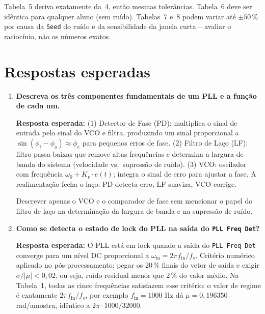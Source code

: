 \documentclass[11pt,a4paper]{article}
\begin{document}
\begin{nota}
Tabela~5 deriva exatamente da~4, então mesmas tolerâncias. Tabela~6
deve ser idêntica para qualquer aluno (sem ruído). Tabelas~7 e~8 podem
variar até $\pm 50\,\%$ por causa da \texttt{Seed} do ruído e da
sensibilidade da janela curta -- avaliar o raciocínio, não os números
exatos.
\end{nota}

\section*{Respostas esperadas}

\begin{enumerate}[label=\textbf{Q\arabic*.}, leftmargin=*, itemsep=1em]

  \item \textbf{Descreva os três componentes fundamentais de um PLL e a função de cada um.}

    \textbf{Resposta esperada:} (1) Detector de Fase (PD): multiplica o sinal de entrada
    pelo sinal do VCO e filtra, produzindo um sinal proporcional a
    $\sin(\phi_i - \phi_o) \approx \phi_e$ para pequenos erros de fase.
    (2) Filtro de Laço (LF): filtro passa-baixas que remove altas frequências e
    determina a largura de banda do sistema (velocidade vs.\ supressão de ruído).
    (3) VCO: oscilador com frequência $\omega_0 + K_v \cdot e(t)$; integra o sinal
    de erro para ajustar a fase. A realimentação fecha o laço: PD detecta erro, LF
    suaviza, VCO corrige.

    \begin{nota}
      Descrever apenas o VCO e o comparador de fase sem mencionar o papel do filtro
      de laço na determinação da largura de banda e na supressão de ruído.
    \end{nota}

  \item \textbf{Como se detecta o estado de lock do PLL na saída do \texttt{PLL Freq Det}?}

    \textbf{Resposta esperada:} O PLL está em lock quando a saída do \texttt{PLL Freq Det}
    converge para um nível DC proporcional a $\omega_\text{in} = 2\pi f_\text{in}/f_s$.
    Critério numérico aplicado no pós-processamento: pegar os 20\,\% finais do vetor de
    saída e exigir $\sigma/|\mu| < 0{,}02$, ou seja, ruído residual menor que 2\,\% do
    valor médio. Na Tabela~1, todas as cinco frequências satisfazem esse critério: o
    valor de regime é exatamente $2\pi f_\text{in}/f_s$, por exemplo $f_\text{in}=1000$
    Hz dá $\mu = 0{,}196350$ rad/amostra, idêntico a $2\pi \cdot 1000/32000$.


\end{enumerate}
\end{document}
